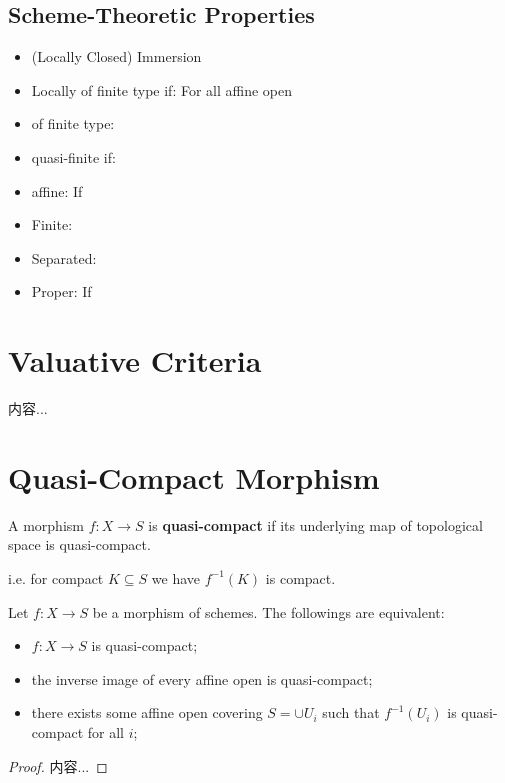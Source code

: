 \documentclass[Total.tex]{subfiles}
\begin{document}
			\subsection{Scheme-Theoretic Properties}
				\begin{Def}
					\begin{itemize}
						\item (Locally Closed) Immersion
						\item Locally of finite type if: For all affine open 
						\item of finite type:
						\item quasi-finite if:
						\item affine: If
						\item Finite:
						\item Separated:
						\item Proper: If
					\end{itemize}
				\end{Def}
		\section{Valuative Criteria}
			\begin{Def}
				内容...
			\end{Def}
		\section{Quasi-Compact Morphism}
			\begin{Def}
				A morphism $f:X\rightarrow S$ is \textbf{quasi-compact} if its underlying map of topological space is quasi-compact. 
				
				i.e. for compact $K\subseteq S$ we have $f^{-1}(K)$ is compact.
			\end{Def}
			\begin{proposition}
				Let $f:X\rightarrow S$ be a morphism of schemes. The followings are equivalent:
				\begin{itemize}
					\item $f:X\rightarrow S$ is quasi-compact;
					\item the inverse image of every affine open is quasi-compact;
					\item there exists some affine open covering $S=\cup U_i$ such that $f^{-1}(U_i)$ is quasi-compact for all $i$;
				\end{itemize}
			\end{proposition}
			\begin{proof}
				内容...
			\end{proof}
			
\end{document}
